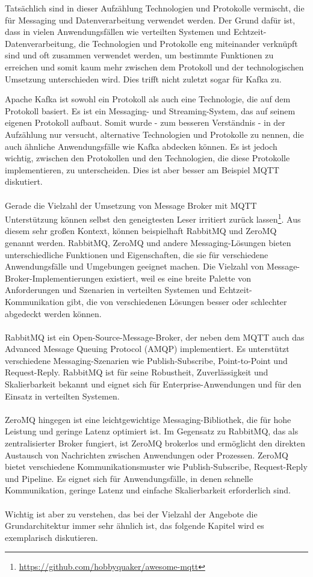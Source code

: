 Tatsächlich sind in dieser Aufzählung Technologien und Protokolle vermischt, die für Messaging und Datenverarbeitung verwendet werden. Der Grund dafür ist, dass in vielen Anwendungsfällen wie verteilten Systemen und Echtzeit-Datenverarbeitung, die Technologien und Protokolle eng miteinander verknüpft sind und oft zusammen verwendet werden, um bestimmte Funktionen zu erreichen und somit kaum mehr zwischen dem Protokoll und der technologischen Umsetzung unterschieden wird. Dies trifft nicht zuletzt sogar für Kafka zu. 

Apache Kafka ist sowohl ein Protokoll als auch eine Technologie, die auf dem Protokoll basiert. Es ist ein Messaging- und Streaming-System, das auf seinem eigenen Protokoll aufbaut. Somit wurde - zum besseren Verständnis - in der Aufzählung nur versucht, alternative Technologien und Protokolle zu nennen, die auch ähnliche Anwendungsfälle wie Kafka abdecken können. Es ist jedoch wichtig, zwischen den Protokollen und den Technologien, die diese Protokolle implementieren, zu unterscheiden. Dies ist aber besser am Beispiel MQTT diskutiert.
\\\\
Gerade die Vielzahl der Umsetzung von Message Broker mit MQTT Unterstützung können selbst den geneigtesten Leser irritiert zurück lassen\footnote{\url{https://github.com/hobbyquaker/awesome-mqtt}}. Aus diesem sehr großen Kontext, können beispielhaft RabbitMQ und ZeroMQ genannt werden. RabbitMQ, ZeroMQ und andere Messaging-Lösungen bieten unterschiedliche Funktionen und Eigenschaften, die sie für verschiedene Anwendungsfälle und Umgebungen geeignet machen. Die Vielzahl von Message-Broker-Implementierungen existiert, weil es eine breite Palette von Anforderungen und Szenarien in verteilten Systemen und Echtzeit-Kommunikation gibt, die von verschiedenen Lösungen besser oder schlechter abgedeckt werden können.
\\\\
RabbitMQ ist ein Open-Source-Message-Broker, der neben dem MQTT auch das Advanced Message Queuing Protocol (AMQP) implementiert. Es unterstützt verschiedene Messaging-Szenarien wie Publish-Subscribe, Point-to-Point und Request-Reply. RabbitMQ ist für seine Robustheit, Zuverlässigkeit und Skalierbarkeit bekannt und eignet sich für Enterprise-Anwendungen und für den Einsatz in verteilten Systemen.
\\\\
ZeroMQ hingegen ist eine leichtgewichtige Messaging-Bibliothek, die für hohe Leistung und geringe Latenz optimiert ist. Im Gegensatz zu RabbitMQ, das als zentralisierter Broker fungiert, ist ZeroMQ brokerlos und ermöglicht den direkten Austausch von Nachrichten zwischen Anwendungen oder Prozessen. ZeroMQ bietet verschiedene Kommunikationsmuster wie Publish-Subscribe, Request-Reply und Pipeline. Es eignet sich für Anwendungsfälle, in denen schnelle Kommunikation, geringe Latenz und einfache Skalierbarkeit erforderlich sind.
\\\\
Wichtig ist aber zu verstehen, das bei der Vielzahl der Angebote die Grundarchitektur immer sehr ähnlich ist, das folgende Kapitel wird es exemplarisch diskutieren.

